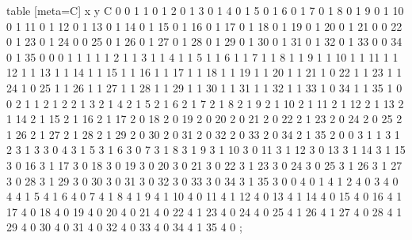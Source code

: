 table [meta=C] {
x y C
0 0 1
1 0 1
2 0 1
3 0 1
4 0 1
5 0 1
6 0 1
7 0 1
8 0 1
9 0 1
10 0 1
11 0 1
12 0 1
13 0 1
14 0 1
15 0 1
16 0 1
17 0 1
18 0 1
19 0 1
20 0 1
21 0 0
22 0 1
23 0 1
24 0 0
25 0 1
26 0 1
27 0 1
28 0 1
29 0 1
30 0 1
31 0 1
32 0 1
33 0 0
34 0 1
35 0 0
0 1 1
1 1 1
2 1 1
3 1 1
4 1 1
5 1 1
6 1 1
7 1 1
8 1 1
9 1 1
10 1 1
11 1 1
12 1 1
13 1 1
14 1 1
15 1 1
16 1 1
17 1 1
18 1 1
19 1 1
20 1 1
21 1 0
22 1 1
23 1 1
24 1 0
25 1 1
26 1 1
27 1 1
28 1 1
29 1 1
30 1 1
31 1 1
32 1 1
33 1 0
34 1 1
35 1 0
0 2 1
1 2 1
2 2 1
3 2 1
4 2 1
5 2 1
6 2 1
7 2 1
8 2 1
9 2 1
10 2 1
11 2 1
12 2 1
13 2 1
14 2 1
15 2 1
16 2 1
17 2 0
18 2 0
19 2 0
20 2 0
21 2 0
22 2 1
23 2 0
24 2 0
25 2 1
26 2 1
27 2 1
28 2 1
29 2 0
30 2 0
31 2 0
32 2 0
33 2 0
34 2 1
35 2 0
0 3 1
1 3 1
2 3 1
3 3 0
4 3 1
5 3 1
6 3 0
7 3 1
8 3 1
9 3 1
10 3 0
11 3 1
12 3 0
13 3 1
14 3 1
15 3 0
16 3 1
17 3 0
18 3 0
19 3 0
20 3 0
21 3 0
22 3 1
23 3 0
24 3 0
25 3 1
26 3 1
27 3 0
28 3 1
29 3 0
30 3 0
31 3 0
32 3 0
33 3 0
34 3 1
35 3 0
0 4 0
1 4 1
2 4 0
3 4 0
4 4 1
5 4 1
6 4 0
7 4 1
8 4 1
9 4 1
10 4 0
11 4 1
12 4 0
13 4 1
14 4 0
15 4 0
16 4 1
17 4 0
18 4 0
19 4 0
20 4 0
21 4 0
22 4 1
23 4 0
24 4 0
25 4 1
26 4 1
27 4 0
28 4 1
29 4 0
30 4 0
31 4 0
32 4 0
33 4 0
34 4 1
35 4 0
};
